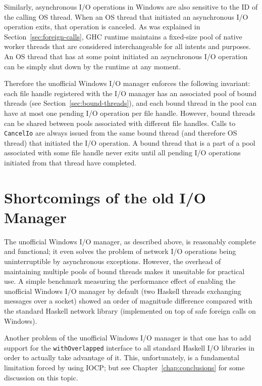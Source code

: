 \documentclass[a4paper,11pt,oneside]{report}
\begin{document}
Similarly, asynchronous I/O operations in Windows are also sensitive to the ID
of the calling OS thread. When an OS thread that initiated an asynchronous I/O
operation exits, that operation is canceled. As was explained in
Section~\ref{sec:foreign-calls}, GHC runtime maintains a fixed-size pool of
native worker threads that are considered interchangeable for all intents and
purposes. An OS thread that has at some point initiated an asynchronous I/O
operation can be simply shut down by the runtime at any moment.

Therefore the unofficial Windows I/O manager enforces the following invariant:
each file handle registered with the I/O manager has an associated pool of
bound threads (see Section~\ref{sec:bound-threads}), and each bound thread in
the pool can have at most one pending I/O operation per file
handle. However, bound threads can be shared between pools associated with
different file handles. Calls to \texttt{CancelIo} are always issued from
the same bound thread (and therefore OS thread) that initiated the I/O
operation. A bound thread that is a part of a pool associated with some file
handle never exits until all pending I/O operations initiated from that
thread have completed.

\section{Shortcomings of the old I/O Manager}
\label{sec:shortcomings-old-io-manager}

The unofficial Windows I/O manager, as described above, is reasonably complete
and functional; it even solves the problem of network I/O operations being
uninterruptible by asynchronous exceptions. However, the overhead of maintaining
multiple pools of bound threads makes it unsuitable for practical use. A simple
benchmark measuring the performance effect of enabling the unofficial Windows
I/O manager by default (two Haskell threads exchanging messages over a socket)
showed an order of magnitude difference compared with the standard Haskell
network library (implemented on top of safe foreign calls on Windows).

Another problem of the unofficial Windows I/O manager is that one has to add
support for the \texttt{withOverlapped} interface to all standard Haskell I/O
libraries in order to actually take advantage of it. This, unfortunately, is a
fundamental limitation forced by using IOCP; but see
Chapter~\ref{chap:conclusions} for some discussion on this topic.
\end{document}
